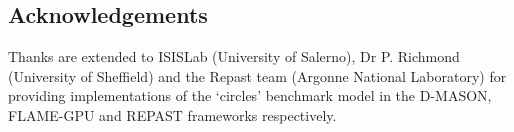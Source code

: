 \documentclass[british]{llncs}
\begin{document}
\mainmatter







  
\subsection*{Acknowledgements}
  Thanks are extended to ISISLab (University of Salerno), Dr P. Richmond (University of Sheffield) and the Repast team (Argonne National Laboratory) for providing implementations of the `circles' benchmark model in the D-MASON, FLAME-GPU and REPAST frameworks respectively.

%


\end{document}
